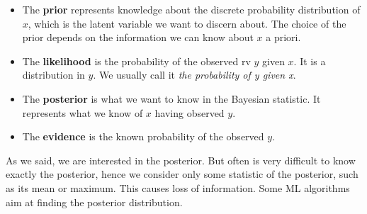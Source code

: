 \begin{itemize}
    \item The \textbf{prior} represents knowledge about the discrete probability distribution of $x$, which is the latent variable we want to discern about. The choice of the prior depends on the information we can know about $x$ a priori.
    \item The \textbf{likelihood} is the probability of the observed rv $y$ given $x$. It is a distribution in $y$. We usually call it \textit{the probability of y given x}.
    \item The \textbf{posterior} is what we want to know in the Bayesian statistic. It represents what we know of $x$ having observed $y$.
    \item The \textbf{evidence} is the known probability of the observed $y$.
\end{itemize}

As we said, we are interested in the posterior. But often is very difficult to know exactly the posterior, hence we consider only some statistic of the posterior, such as its mean or maximum. This causes loss of information. Some ML algorithms aim at finding the posterior distribution.



  
  
  

